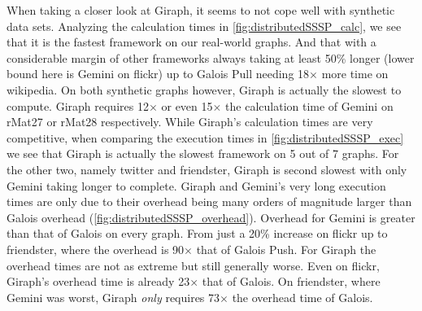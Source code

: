 When taking a closer look at Giraph, it seems to not cope well with synthetic data sets. Analyzing the calculation times in \autoref{fig:distributedSSSP_calc}, we see that it is the fastest framework on our real-world graphs. And that with a considerable margin of other frameworks always taking at least 50\% longer (lower bound here is Gemini on flickr) up to Galois Pull needing 18$\times$ more time on wikipedia.
On both synthetic graphs however, Giraph is actually the slowest to compute. Giraph requires 12$\times$ or even 15$\times$ the calculation time of Gemini on rMat27 or rMat28 respectively.
While Giraph's calculation times are very competitive, when comparing the execution times in \autoref{fig:distributedSSSP_exec} we see that Giraph is actually the slowest framework on 5 out of 7 graphs. For the other two, namely twitter and friendster, Giraph is second slowest with only Gemini taking longer to complete.
Giraph and Gemini's very long execution times are only due to their overhead being many orders of magnitude larger than Galois overhead (\autoref{fig:distributedSSSP_overhead}).
Overhead for Gemini is greater than that of Galois on every graph. From just a 20\% increase on flickr up to friendster, where the overhead is 90$\times$ that of Galois Push.
For Giraph the overhead times are not as extreme but still generally worse. Even on flickr, Giraph's overhead time is already 23$\times$ that of Galois. On friendster, where Gemini was worst, Giraph \emph{only} requires 73$\times$ the overhead time of Galois.

